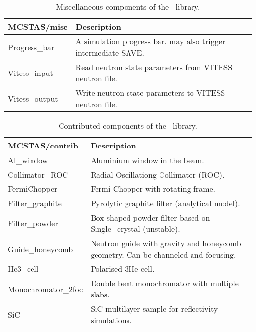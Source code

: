 \begin{table}
  \begin{center}
    {\let\my=\\
    \begin{tabular}{|p{}|p{}|}
      \hline
       MCSTAS/misc & Description \\ 
       \hline
       Progress\_bar  &       A simulation
                      progress bar. may also trigger intermediate SAVE.\\ 
 Vitess\_input      &   Read neutron state
                      parameters from
                      VITESS neutron file.\\ 
 Vitess\_output    &  Write neutron state
     parameters to VITESS
                      neutron file.\\
      \hline
    \end{tabular}
    \caption{Miscellaneous components of the \MCS\ library.}
    \label{t:comp-misc}
    }
  \end{center}
\end{table}

\begin{table}
  \begin{center}
    {\let\my=\\
    \begin{tabular}{|p{}|p{}|}
      \hline
       MCSTAS/contrib & Description \\ 
       \hline
       Al\_window     &         Aluminium
                        window in the beam. \\
 Collimator\_ROC   &      Radial
                        Oscillationg
                        Collimator (ROC). \\
 FermiChopper    &       Fermi Chopper with
                        rotating frame. \\
 Filter\_graphite  &      Pyrolytic
                        graphite filter
                        (analytical model). \\
 Filter\_powder   &       Box-shaped powder
                        filter based on Single\_crystal (unstable). \\
 Guide\_honeycomb & Neutron guide
                        with gravity and
                        honeycomb geometry. Can be
                        channeled and
                        focusing. \\
 He3\_cell    &           Polarised 3He cell. \\

 Monochromator\_2foc   &  Double bent
                        monochromator with
                        multiple slabs. \\

 SiC           &         SiC multilayer sample for reflectivity simulations. \\
      \hline
    \end{tabular}
    \caption{Contributed components of the \MCS\ library.}
    \label{t:comp-contrib}
    }
  \end{center}
\end{table}

